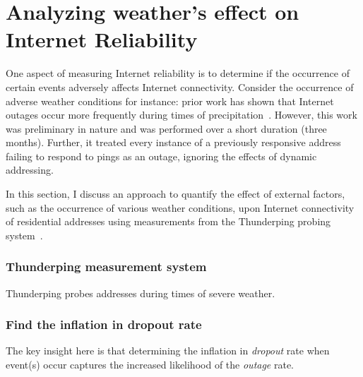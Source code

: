 
\chapter{Analyzing weather's effect on Internet Reliability}
\label{cpt:weather}

One aspect of measuring Internet reliability is to determine if the occurrence of certain events adversely affects Internet connectivity. Consider the occurrence of adverse weather conditions for instance: prior work has shown that Internet outages occur more frequently during times of precipitation~\cite{pingin}. However, this work was preliminary in nature and was performed over a short duration (three months). Further, it treated every instance of a previously responsive address failing to respond to pings as an outage, ignoring the effects of dynamic addressing.

In this section, I discuss an approach to quantify the effect of external factors, such as the occurrence of various weather conditions, upon Internet connectivity of residential addresses using measurements from the Thunderping probing system~\cite{pingin}. 

\subsection{Thunderping measurement system}

Thunderping probes addresses during times of severe weather. 

\subsection{Find the inflation in dropout rate}

The key insight here is that determining the inflation in \emph{dropout} rate when event(s) occur captures the increased likelihood of the \emph{outage} rate. 




 